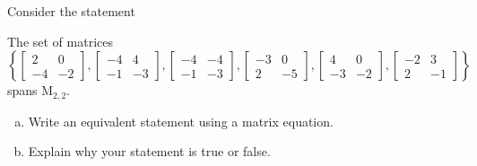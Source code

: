 
\begin{exerciseStatement}


Consider the statement 
\begin{center}\begin{minipage}{0.8\textwidth}
 The set of matrices \( \left\{ \left[\begin{array}{cc}
2 & 0 \\
-4 & -2
\end{array}\right] , \left[\begin{array}{cc}
-4 & 4 \\
-1 & -3
\end{array}\right] , \left[\begin{array}{cc}
-4 & -4 \\
-1 & -3
\end{array}\right] , \left[\begin{array}{cc}
-3 & 0 \\
2 & -5
\end{array}\right] , \left[\begin{array}{cc}
4 & 0 \\
-3 & -2
\end{array}\right] , \left[\begin{array}{cc}
-2 & 3 \\
2 & -1
\end{array}\right] \right\} \) spans \(\mathrm{M}_{2,2}\). 
\end{minipage}\end{center}
    


\begin{enumerate}[(a)]
\item  Write an equivalent statement using a matrix equation.
\item  Explain why your statement is true or false.
\end{enumerate}
    
\end{exerciseStatement}
    
